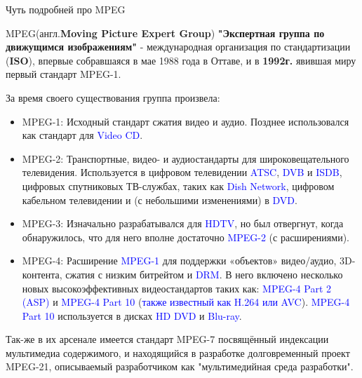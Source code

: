 \documentclass[aspectratio=169]{beamer}
\newcommand{\blu}{\textcolor{blue}}
\newcommand{\zag}{\huge\alert}
\newcommand{\n}{\normalsize}
\begin{document}
\begin{frame}[shrink=24]{Чуть подробней про MPEG}

    \zag{MPEG}\n (англ.\textbf{Moving Picture Expert Group}) \textbf{"Экспертная группа по движущимся изображениям"} - международная организация по стандартизации (\textbf{ISO}), впервые собравшаяся в мае 1988 года в Оттаве, и в \textbf{1992г.} явившая миру первый стандарт \alert{MPEG-1}.
    
    \vspace{5pt}
    
    За время своего существования группа произвела:
    \begin{itemize}
\setlength\itemsep{1mm}
        \item \alert{MPEG-1}: Исходный стандарт сжатия видео и аудио. Позднее использовался как стандарт для \blu{Video CD}.
        \item \alert{MPEG-2}: Транспортные, видео- и аудиостандарты для широковещательного телевидения. Используется в цифровом телевидении \blu{ATSC}, \blu{DVB} и \blu{ISDB}, цифровых спутниковых ТВ-службах, таких как \blu{Dish Network}, цифровом кабельном телевидении и (с небольшими изменениями) в \blu{DVD}.
        \item \alert{MPEG-3}: Изначально разрабатывался для \blu{HDTV}, но был отвергнут, когда обнаружилось, что для него вполне достаточно \blu{MPEG-2} (с расширениями).
        \item \alert{MPEG-4}: Расширение \blu{MPEG-1} для поддержки «объектов» видео/аудио, 3D-контента, сжатия с низким битрейтом и \blu{DRM}.%
        В него включено несколько новых высокоэффективных видеостандартов таких как: \blu{MPEG-4 Part 2 (ASP)} и
\blu{MPEG-4 Part 10} (\blu{также известный как H.264 или AVC}). \blu{MPEG-4 Part 10} используется в дисках \blu{HD DVD} и \blu{Blu-ray}.
    \end{itemize}

\vspace{10pt}

\small Так-же в их арсенале имеется стандарт \alert{MPEG-7} посвящённый индексации мультимедиа содержимого, и находящийся в разработке долговременный проект \alert{MPEG-21}, описываемый разработчиком как "мультимедийная среда разработки".
\end{frame}
\end{document}
